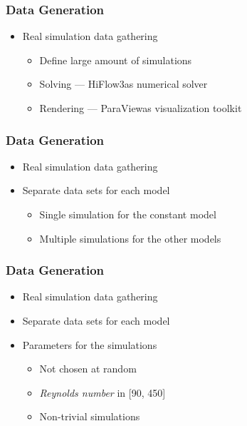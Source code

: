 \documentclass[18pt, xcolor=table]{beamer}
\begin{document}
\begin{frame}[t]
  \frametitle{Data Generation}
  \begin{itemize}
  \item Real simulation data gathering
    \begin{itemize}
    \item Define large amount of simulations
    \item Solving --- HiFlow3\footnotemark as numerical solver
    \item Rendering --- ParaView\footnotemark as visualization toolkit
    \end{itemize}
  \end{itemize}
\end{frame}


\begin{frame}[t]
  \frametitle{Data Generation}
  \begin{itemize}
  \item Real simulation data gathering
  \item Separate data sets for each model
    \begin{itemize}
    \item Single simulation for the constant model
    \item Multiple simulations for the other models
    \end{itemize}
  \end{itemize}
\end{frame}

\begin{frame}[t]
  \frametitle{Data Generation}
  \begin{itemize}
  \item Real simulation data gathering
  \item Separate data sets for each model
  \item Parameters for the simulations
    \begin{itemize}
    \item Not chosen at random
    \item \textit{Reynolds number} in [90, 450]
    \item Non-trivial simulations
    \end{itemize}
  \end{itemize}
\end{frame}
\end{document}
